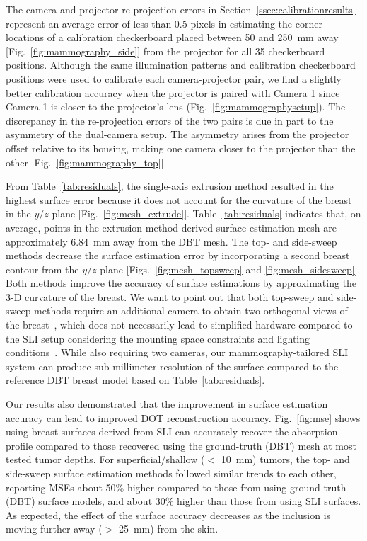The camera and projector re-projection errors in Section~\ref{ssec:calibrationresults} represent an average error of less than 0.5 pixels in estimating the corner locations of a calibration checkerboard placed between 50 and 250~mm away [Fig.~\ref{fig:mammography_side}] from the projector for all 35 checkerboard positions. Although the same illumination patterns and calibration checkerboard positions were used to calibrate each camera-projector pair, we find a slightly better calibration accuracy when the projector is paired with Camera 1 since Camera 1 is closer to the projector's lens (Fig.~\ref{fig:mammographysetup}). The discrepancy in the re-projection errors of the two pairs is due in part to the asymmetry of the dual-camera setup. The asymmetry arises from the projector offset relative to its housing, making one camera closer to the projector than the other [Fig.~\ref{fig:mammography_top}]. 

From Table~\ref{tab:residuals}, the single-axis extrusion method resulted in the highest surface error because it does not account for the curvature of the breast in the $y/z$ plane [Fig.~\ref{fig:mesh_extrude}]. Table~\ref{tab:residuals} indicates that, on average, points in the extrusion-method-derived surface estimation mesh are approximately 6.84~mm away from the DBT mesh. The top- and side-sweep methods decrease the surface estimation error by incorporating a second breast contour from the $y/z$ plane [Figs.~\ref{fig:mesh_topsweep} and \ref{fig:mesh_sidesweep}]. Both methods improve the accuracy of surface estimations by approximating the 3-D curvature of the breast. We want to point out that both top-sweep and side-sweep methods require an additional camera to obtain two orthogonal views of the breast~\cite{Pinto2020}, which does not necessarily lead to simplified hardware compared to the SLI setup considering the mounting space constraints and lighting conditions~\cite{Rodriguez2017}. While also requiring two cameras, our mammography-tailored SLI system can produce sub-millimeter resolution of the surface compared to the reference DBT breast model based on Table~\ref{tab:residuals}.

Our results also demonstrated that the improvement in surface estimation accuracy can lead to improved DOT reconstruction accuracy. Fig.~\ref{fig:mse} shows using breast surfaces derived from SLI can accurately recover the absorption profile compared to those recovered using the ground-truth (DBT) mesh at most tested tumor depths. For superficial/shallow ($<$ 10~mm) tumors, the top- and side-sweep surface estimation methods followed similar trends to each other, reporting MSEs about 50\% higher compared to those from using ground-truth (DBT) surface models, and about 30\% higher than those from using SLI surfaces. As expected, the effect of the surface accuracy decreases as the inclusion is moving further away ($>$ 25~mm) from the skin.

